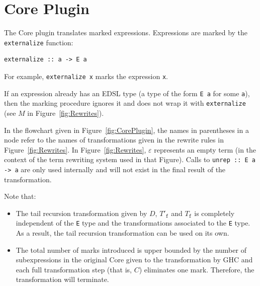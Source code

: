 \documentclass[runningheads, a4paper]{llncs}
\newcommand{\ttt}{\texttt}
\begin{document}
\section{Core Plugin}
\label{sec:CorePlugin}

The Core plugin translates marked expressions. Expressions are marked by
the \ttt{externalize} function:

\begin{lstlisting}
externalize :: a -> E a
\end{lstlisting}

For example, \ttt{externalize x} marks the expression \ttt{x}.

If an expression already has an EDSL type (a type of the form \ttt{E a} for some
\ttt{a}), then the marking procedure ignores it and does not wrap it with
\ttt{externalize} (see $M$ in Figure~\ref{fig:Rewrites}).

In the flowchart given in Figure~\ref{fig:CorePlugin}, the names in parentheses in a node refer
to the names of transformations given in the rewrite rules in Figure~\ref{fig:Rewrites}. In Figure~\ref{fig:Rewrites},
$\varepsilon$ represents an empty term (in the context of the term rewriting system used in that Figure). Calls
to \ttt{unrep :: E a -> a} are only used internally and will not exist in
the final result of the transformation.

Note that:
\begin{itemize}
  \item The tail recursion transformation given by $D$, $T'_{\ttt{f}}$ and $T_{\ttt{f}}$ is completely independent of the \ttt{E} type and the transformations associated to the \ttt{E} type. As a result, the tail recursion transformation can be used on its own.

  \item The total number of marks introduced is upper bounded by the number of
subexpressions in the original Core given to the transformation by GHC and each
full transformation step (that is, $C$) eliminates one mark. Therefore, the
transformation will terminate.
\end{itemize}
\end{document}
